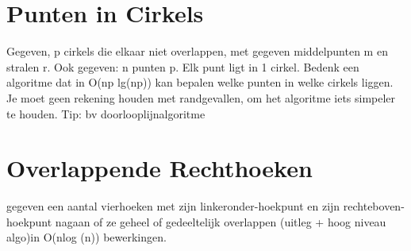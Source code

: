 \documentclass[12pt,a4paper]{article}
\begin{document}
\section{Punten in Cirkels}
Gegeven, p cirkels die elkaar niet overlappen, met gegeven middelpunten m en stralen r.
Ook gegeven: n punten p. Elk punt ligt in 1 cirkel.
Bedenk een algoritme dat in O(np lg(np)) kan bepalen welke punten in welke cirkels liggen.
Je moet geen rekening houden met randgevallen, om het algoritme iets simpeler te houden.
Tip: bv doorlooplijnalgoritme 

\section{Overlappende Rechthoeken}
gegeven een aantal vierhoeken met zijn linkeronder-hoekpunt en zijn rechteboven-hoekpunt nagaan of ze geheel of gedeeltelijk overlappen (uitleg + hoog niveau algo)in O(nlog (n)) bewerkingen. 


\fi
\end{document}
